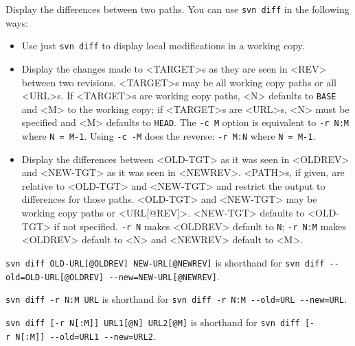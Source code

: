 Display the differences between two paths. You can use
\texttt{svn\ diff} in the following ways:

\begin{itemize}
\item
  Use just \texttt{svn\ diff} to display local modifications in a
  working copy.
\item
  Display the changes made to \textless TARGET\textgreater s as they are
  seen in \textless REV\textgreater{} between two revisions.
  \textless TARGET\textgreater s may be all working copy paths or all
  \textless URL\textgreater s. If \textless TARGET\textgreater s are
  working copy paths, \textless N\textgreater{} defaults to
  \texttt{BASE} and \textless M\textgreater{} to the working copy; if
  \textless TARGET\textgreater s are \textless URL\textgreater s,
  \textless N\textgreater{} must be specified and
  \textless M\textgreater{} defaults to \texttt{HEAD}. The
  \texttt{-c\ M} option is equivalent to \texttt{-r\ N:M} where
  \texttt{N\ =\ M-1}. Using \texttt{-c\ -M} does the reverse:
  \texttt{-r\ M:N} where \texttt{N\ =\ M-1}.
\item
  Display the differences between \textless OLD-TGT\textgreater{} as it
  was seen in \textless OLDREV\textgreater{} and
  \textless NEW-TGT\textgreater{} as it was seen in
  \textless NEWREV\textgreater. \textless PATH\textgreater s, if given,
  are relative to \textless OLD-TGT\textgreater{} and
  \textless NEW-TGT\textgreater{} and restrict the output to differences
  for those paths. \textless OLD-TGT\textgreater{} and
  \textless NEW-TGT\textgreater{} may be working copy paths or
  \textless URL{[}@REV{]}\textgreater. \textless NEW-TGT\textgreater{}
  defaults to \textless OLD-TGT\textgreater{} if not specified.
  \texttt{-r\ N} makes \textless OLDREV\textgreater{} default to
  \texttt{N}; \texttt{-r\ N:M} makes \textless OLDREV\textgreater{}
  default to \textless N\textgreater{} and
  \textless NEWREV\textgreater{} default to \textless M\textgreater.
\end{itemize}

\texttt{svn\ diff\ OLD-URL{[}@OLDREV{]}\ NEW-URL{[}@NEWREV{]}} is
shorthand for
\texttt{svn\ diff\ -\/-old=OLD-URL{[}@OLDREV{]}\ -\/-new=NEW-URL{[}@NEWREV{]}}.

\texttt{svn\ diff\ -r\ N:M\ URL} is shorthand for
\texttt{svn\ diff\ -r\ N:M\ -\/-old=URL\ -\/-new=URL}.

\texttt{svn\ diff\ {[}-r\ N{[}:M{]}{]}\ URL1{[}@N{]}\ URL2{[}@M{]}} is
shorthand for
\texttt{svn\ diff\ {[}-r\ N{[}:M{]}{]}\ -\/-old=URL1\ -\/-new=URL2}.

